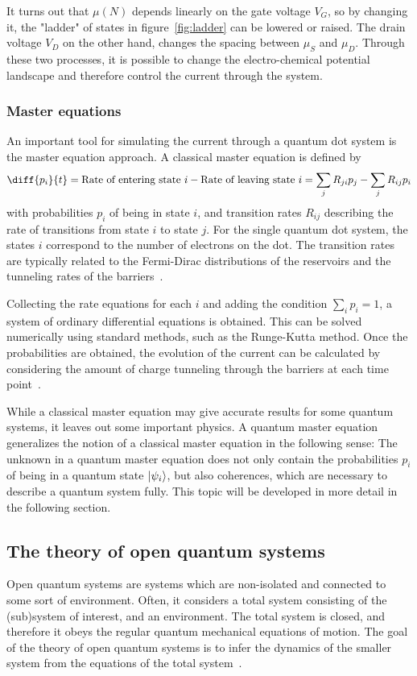 \documentclass[../main.tex]{subfiles}
\begin{document}
It turns out that $\mu(N)$ depends linearly on the gate voltage $V_G$, so by changing it, the "ladder" of states in figure~\ref{fig:ladder} can be lowered or raised. The drain voltage $V_D$ on the other hand, changes the spacing between $\mu_S$ and $\mu_D$. Through these two processes, it is possible to change the electro-chemical potential landscape and therefore control the current through the system. 

\subsubsection{Master equations}
An important tool for simulating the current through a quantum dot system is the master equation approach. A classical master equation is defined by
\begin{equation}\label{master}
    \diff{p_i}{t} = \text{Rate of entering state } i - \text{Rate of leaving state } i = \sum_j R_{ji}p_j  - \sum_j R_{ij}p_i
\end{equation}
with probabilities $p_i$ of being in state $i$, and transition rates $R_{ij}$ describing the rate of transitions from state $i$ to state $j$. For the single quantum dot system, the states $i$ correspond to the number of electrons on the dot. The transition rates are typically related to the Fermi-Dirac distributions of the reservoirs and the tunneling rates of the barriers~\cite{transport}.

Collecting the rate equations for each $i$ and adding the condition $\sum_i p_i = 1$, a system of ordinary differential equations is obtained. This can be solved numerically using standard methods, such as the Runge-Kutta method. Once the probabilities are obtained, the evolution of the current can be calculated by considering the amount of charge tunneling through the barriers at each time point~\cite{transport}.

While a classical master equation may give accurate results for some quantum systems, it leaves out some important physics. A quantum master equation generalizes the notion of a classical master equation in the following sense: The unknown in a quantum master equation does not only contain the probabilities $p_i$ of being in a quantum state $\ket{\psi_i}$, but also coherences, which are necessary to describe a quantum system fully. This topic will be developed in more detail in the following section.
\subsection{The theory of open quantum systems}
Open quantum systems are systems which are non-isolated and connected to some sort of environment. Often, it considers a total system consisting of the (sub)system of interest, and an environment. The total system is closed, and therefore it obeys the regular quantum mechanical equations of motion. The goal of the theory of open quantum systems is to infer the dynamics of the smaller system from the equations of the total system~\cite{lindblad}. 
\end{document}

